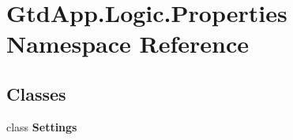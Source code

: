 \section{Gtd\+App.\+Logic.\+Properties Namespace Reference}
\label{namespace_gtd_app_1_1_logic_1_1_properties}
\subsection*{Classes}
\begin{DoxyCompactItemize}
\item 
class {\bfseries Settings}
\end{DoxyCompactItemize}
